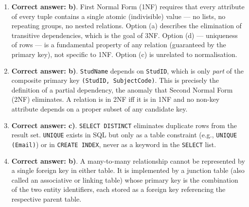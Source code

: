 \documentclass[11pt]{article}
\newcommand{\cle}[1]{{\popxbold\color{popdark}#1}}
\begin{document}
\begin{corrige}
\begin{enumerate}
\item \textbf{Correct answer: b)}. First Normal Form (1NF) requires that every attribute of every tuple contains a single \cle{atomic} (indivisible) value — no lists, no repeating groups, no nested relations. Option (a) describes the elimination of transitive dependencies, which is the goal of 3NF. Option (d) — uniqueness of rows — is a fundamental property of any relation (guaranteed by the primary key), not specific to 1NF. Option (c) is unrelated to normalisation.
\item \textbf{Correct answer: b)}. \texttt{StudName} depends on \texttt{StudID}, which is only \emph{part} of the composite primary key \texttt{(StudID, SubjectCode)}. This is precisely the definition of a \cle{partial dependency}, the anomaly that Second Normal Form (2NF) eliminates. A relation is in 2NF iff it is in 1NF and no non-key attribute depends on a proper subset of any candidate key.
\item \textbf{Correct answer: c)}. \texttt{SELECT DISTINCT} eliminates duplicate rows from the result set. \texttt{UNIQUE} exists in SQL but only as a table constraint (e.g., \texttt{UNIQUE (Email)}) or in \texttt{CREATE INDEX}, never as a keyword in the \texttt{SELECT} list.
\item \textbf{Correct answer: b)}. A many-to-many relationship cannot be represented by a single foreign key in either table. It is implemented by a \cle{junction table} (also called an associative or linking table) whose primary key is the combination of the two entity identifiers, each stored as a foreign key referencing the respective parent table.
\end{enumerate}
\end{corrige}
\end{document}
